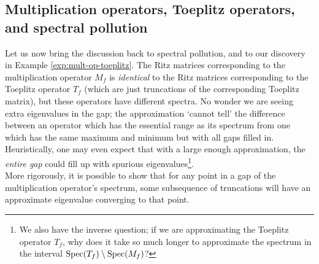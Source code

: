 \documentclass[../main.tex]{subfiles}
\begin{document}
\subsection{Multiplication operators, Toeplitz operators, and spectral pollution}
Let us now bring the discussion back to spectral pollution, and to our discovery in Example \ref{exp:mult-op-toeplitz}. The Ritz matrices corresponding to the
multiplication operator $M_f$ is \emph{identical} to the Ritz matrices corresponding to the Toeplitz operator $T_f$ (which are just truncations of the 
corresponding Toeplitz matrix), but these operators have different spectra. No wonder we are seeing extra eigenvalues in the gap; the approximation
`cannot tell' the difference between an operator which has the essential range as its spectrum from one which has the same maximum and minimum but with
all gaps filled in. Heuristically, one may even expect that with a large enough approximation, the \emph{entire gap} could fill up with spurious
eigenvalues\footnote{We also have the inverse question; if we are approximating the Toeplitz operator $T_f$, why does it take so much longer to 
approximate the spectrum in the interval $\mathrm{Spec}(T_f) \setminus \mathrm{Spec}(M_f)$?}.\\

More rigorously, it is possible to show that for any point in a gap of the multiplication operator's spectrum, some subsequence of truncations will have 
an approximate eigenvalue converging to that point. 
\end{document}
